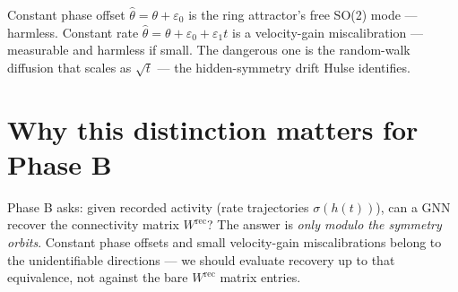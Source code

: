 \documentclass[11pt]{article}
\begin{document}
Constant phase offset $\hat\theta = \theta + \varepsilon_0$ is the ring
attractor's free SO(2) mode --- harmless. Constant rate
$\hat\theta = \theta + \varepsilon_0 + \varepsilon_1 t$ is a velocity-gain
miscalibration --- measurable and harmless if small.
The dangerous one is the random-walk diffusion that scales as $\sqrt{t}$ ---
the hidden-symmetry drift Hulse identifies.

\section*{Why this distinction matters for Phase B}

Phase B asks: given recorded activity (rate trajectories $\sigma(h(t))$),
can a GNN recover the connectivity matrix $W^{\mathrm{rec}}$? The answer is
\emph{only modulo the symmetry orbits}. Constant phase offsets and small
velocity-gain miscalibrations belong to the unidentifiable directions --- we
should evaluate recovery up to that equivalence, not against the bare
$W^{\mathrm{rec}}$ matrix entries.
\end{document}
